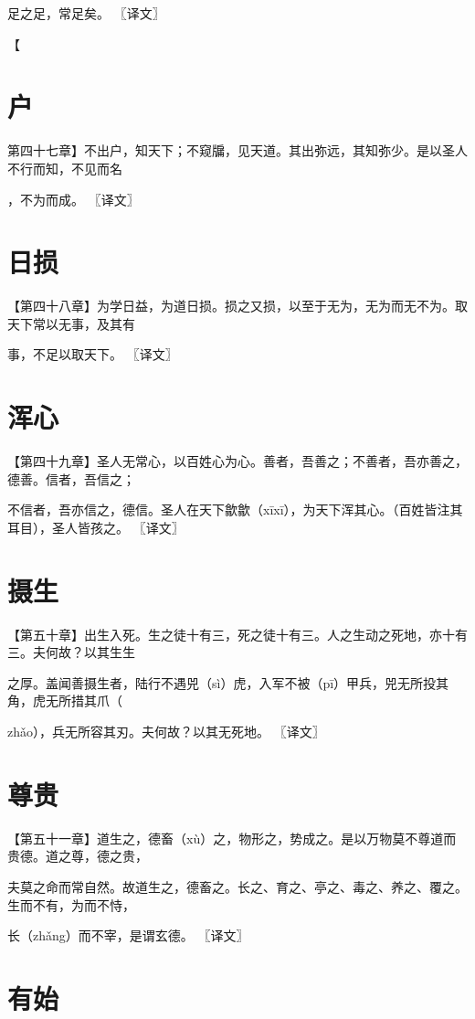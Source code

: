 \documentclass[a4paper,12pt,UTF8,twoside]{ctexbook}
\begin{document}
	足之足，常足矣。 〖译文〗
	
	
	
	【
	\chapter{户}
	第四十七章】不出户，知天下；不窥牖，见天道。其出弥远，其知弥少。是以圣人不行而知，不见而名
	
	，不为而成。 〖译文〗
	
	

	\chapter{日损}
		
	【第四十八章】为学日益，为道日损。损之又损，以至于无为，无为而无不为。取天下常以无事，及其有
	
	事，不足以取天下。 〖译文〗
	
	
	

	\chapter{浑心}
		【第四十九章】圣人无常心，以百姓心为心。善者，吾善之；不善者，吾亦善之，德善。信者，吾信之；
	
	不信者，吾亦信之，德信。圣人在天下歙歙（xīxī），为天下浑其心。（百姓皆注其耳目），圣人皆孩之。 〖译文〗
	
	
	
	
	\chapter{摄生}
	【第五十章】出生入死。生之徒十有三，死之徒十有三。人之生动之死地，亦十有三。夫何故？以其生生
	
	之厚。盖闻善摄生者，陆行不遇兕（sì）虎，入军不被（pī）甲兵，兕无所投其角，虎无所措其爪（
	
	zhǎo），兵无所容其刃。夫何故？以其无死地。 〖译文〗
	
	
	
	
	\chapter{尊贵}
	【第五十一章】道生之，德畜（xù）之，物形之，势成之。是以万物莫不尊道而贵德。道之尊，德之贵，
	
	夫莫之命而常自然。故道生之，德畜之。长之、育之、亭之、毒之、养之、覆之。生而不有，为而不恃，
	
	长（zhǎng）而不宰，是谓玄德。 〖译文〗
	\chapter{有始}
	
\end{document}
